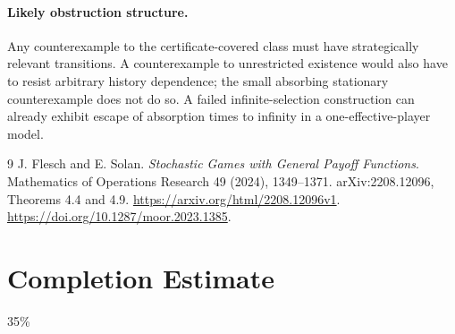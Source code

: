 \documentclass[11pt,a4paper]{article}
\theoremstyle{definition}
\theoremstyle{remark}
\begin{document}
\paragraph{Likely obstruction structure.}
Any counterexample to the certificate-covered class must have strategically relevant transitions. A counterexample to unrestricted existence would also have to resist arbitrary history dependence; the small absorbing stationary counterexample does not do so. A failed infinite-selection construction can already exhibit escape of absorption times to infinity in a one-effective-player model.

\begin{thebibliography}{9}
 J. Flesch and E. Solan. \emph{Stochastic Games with General Payoff Functions}. Mathematics of Operations Research 49 (2024), 1349--1371. arXiv:2208.12096, Theorems 4.4 and 4.9. \url{https://arxiv.org/html/2208.12096v1}. \url{https://doi.org/10.1287/moor.2023.1385}.
\end{thebibliography}

\section{Completion Estimate}
35\%
\end{document}
